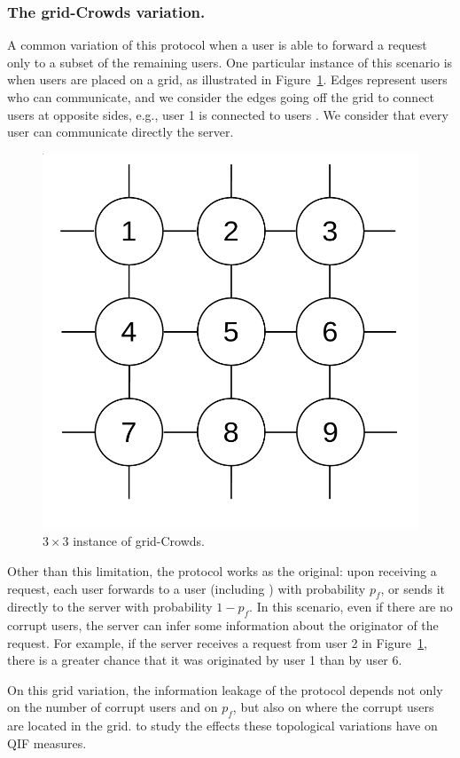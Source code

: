 \subsubsection{The grid-Crowds variation.} 
A common variation of this protocol  when a user 
is able to forward a request only to a subset of the remaining users. 
One particular instance of this scenario is when users are placed on 
a grid, as illustrated in Figure~\ref{figure:crowdsgrid}.
Edges represent users who can communicate, and we consider the edges going 
off the grid to connect users at opposite sides, e.g.,
user 1 is connected to users . 
We consider that every user can  communicate directly  the server.

\begin{figure}
\vspace{-10mm}
\centering
\includegraphics[width=0.9\linewidth]{figures/crowdsgrid.png}
\vspace{-4mm}
\caption{$3{\times}3$ instance of grid-Crowds.}
\label{figure:crowdsgrid}
\vspace{-6mm}
\end{figure}
Other than this limitation, the protocol works as the original: upon receiving a request, each user forwards to a user  (including ) with probability $p_f$, or sends it directly to the server with probability $1{-}p_f$. 
In this scenario, even if there are no corrupt users, the server can infer 
some information about the originator of the request. 
For example, if the server receives a request from user 2 in 
Figure~\ref{figure:crowdsgrid}, there is a greater chance that 
it was originated by user 1 than by user 6.

On this grid variation, the information leakage of the protocol depends 
not only on the number of corrupt users and on $p_f$, but also on where 
the corrupt users are located in the grid. 
 to study the effects these topological variations have on 
QIF measures.